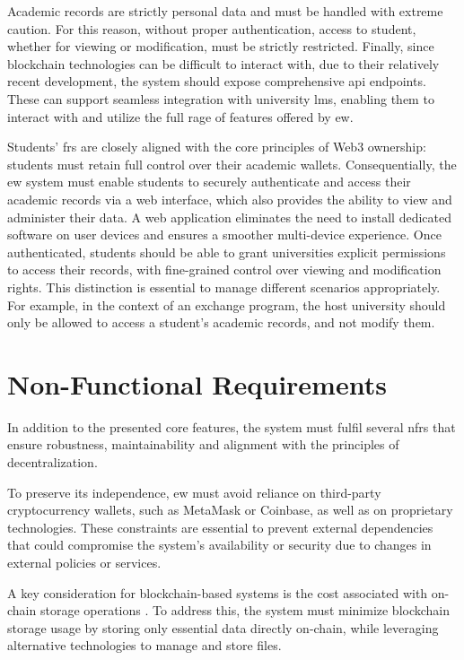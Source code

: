 Academic records are strictly personal data and must be handled with extreme caution. For this reason, without proper authentication, access to student, whether for viewing or modification, must be strictly restricted. 
Finally, since blockchain technologies can be difficult to interact with, due to their relatively recent development, the system should expose comprehensive \gls{api} endpoints. These can support seamless integration with university \gls{lms}, enabling them to interact with and utilize the full rage of features offered by \gls{ew}.

Students' \glspl{fr} are closely aligned with the core principles of Web3 ownership: students must retain full control over their academic wallets. Consequentially, the \gls{ew} system must enable students to securely authenticate and access their academic records via a web interface, which also provides the ability to view and administer their data. A web application eliminates the need to install dedicated software on user devices and ensures a smoother multi-device experience.
Once authenticated, students should be able to grant universities explicit permissions to access their records, with fine-grained control over viewing and modification rights. This distinction is essential to manage different scenarios appropriately. For example, in the context of an exchange program, the host university should only be allowed to access a student's academic records, and not modify them.

\section{Non-Functional Requirements}
\label{sec:nonFunctionalRequirements}
In addition to the presented core features, the system must fulfil several \glspl{nfr} that ensure robustness, maintainability and alignment with the principles of decentralization. 

To preserve its independence, \gls{ew} must avoid reliance on third-party cryptocurrency wallets, such as MetaMask or Coinbase, as well as on proprietary technologies. These constraints are essential to prevent external dependencies that could compromise the system’s availability or security due to changes in external policies or services.

A key consideration for blockchain-based systems is the cost associated with on-chain storage operations \cite{surya2024designdecentralizedidentity}. To address this, the system must minimize blockchain storage usage by storing only essential data directly on-chain, while leveraging alternative technologies to manage and store files.

